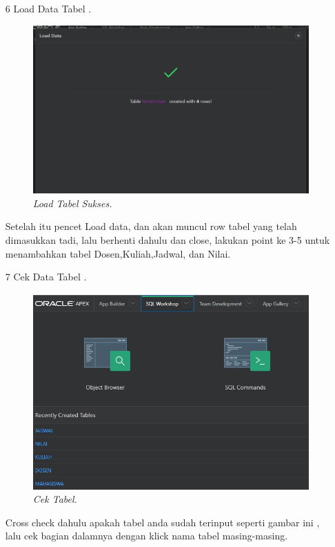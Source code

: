 \begin{enumerate}
\item[6]Load Data Tabel .
\begin{figure}[!htbp]
    \begin{center}
    \includegraphics[scale=0.5]{figures/5.jpg}
    \caption{\textit{Load Tabel Sukses.}}
    \end{center}
\end{figure}
\par Setelah itu pencet Load data, dan akan muncul row tabel yang telah dimasukkan tadi, lalu berhenti dahulu dan close, lakukan point ke 3-5 untuk menambahkan tabel Dosen,Kuliah,Jadwal, dan Nilai.

\item[7]Cek Data Tabel .
\begin{figure}[!htbp]
    \begin{center}
    \includegraphics[scale=0.5]{figures/6.jpg}
    \caption{\textit{Cek Tabel.}}
    \end{center}
\end{figure}
\par Cross check dahulu apakah tabel anda sudah terinput seperti gambar ini , lalu cek bagian dalamnya dengan klick nama tabel masing-masing.


\end{enumerate}
